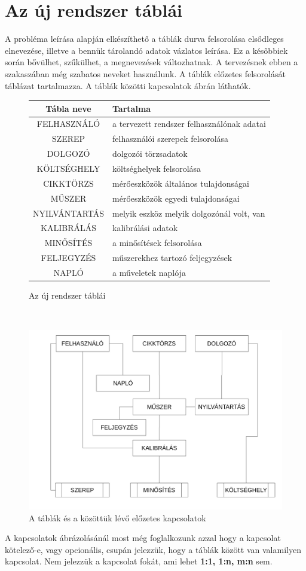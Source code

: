 \documentclass[a4paper,12pt]{report}
\begin{document}
\section{Az új rendszer táblái}
A probléma leírása alapján elkészíthető a táblák durva felsorolása elsődleges 
elnevezése, illetve a bennük tárolandó adatok vázlatos leírása. Ez a későbbiek 
során bővülhet, szűkülhet, a megnevezések változhatnak. A tervezésnek ebben a 
szakaszában még szabatos neveket használunk.
A táblák előzetes felsorolását  táblázat tartalmazza.
A táblák közötti kapcsolatok  ábrán láthatók.
\begin{figure}[ht!]
\centering
\begin{tabular}{|c|l|}
\hline
\textbf{Tábla neve}&\textbf{Tartalma}\\
\hline
FELHASZNÁLÓ & a tervezett rendszer felhasználónak adatai\\
\hline
SZEREP & felhasználói szerepek felsorolása\\
\hline
DOLGOZÓ & dolgozói törzsadatok\\
\hline
KÖLTSÉGHELY & költséghelyek felsorolása\\
\hline
CIKKTÖRZS & mérőeszközök általános tulajdonságai\\
\hline
MŰSZER & mérőeszközök egyedi tulajdonságai\\
\hline
NYILVÁNTARTÁS & melyik eszköz melyik dolgozónál volt, van\\
\hline
KALIBRÁLÁS & kalibrálási adatok\\
\hline
MINŐSÍTÉS & a minősítések felsorolása\\
\hline
FELJEGYZÉS & műszerekhez tartozó feljegyzések\\
\hline
NAPLÓ & a műveletek naplója\\
\hline
\end{tabular}
\caption{Az új rendszer táblái}\label{tablak-0}
\end{figure}
\\

\begin{figure}[ht!]\label{tablak0-kapcs0}
\centering
\includegraphics[width=13cm]{kepek/tablak0-kapcs0.png}
\caption{A táblák és a közöttük lévő előzetes kapcsolatok}
\end{figure}

A kapcsolatok ábrázolásánál most még foglalkozunk azzal hogy a kapcsolat 
kötelező-e, vagy opcionális, csupán jelezzük, hogy a táblák között van 
valamilyen kapcsolat. Nem jelezzük a kapcsolat fokát, ami lehet \textbf{1:1, 
1:n, m:n} sem.





% 
\end{document}
